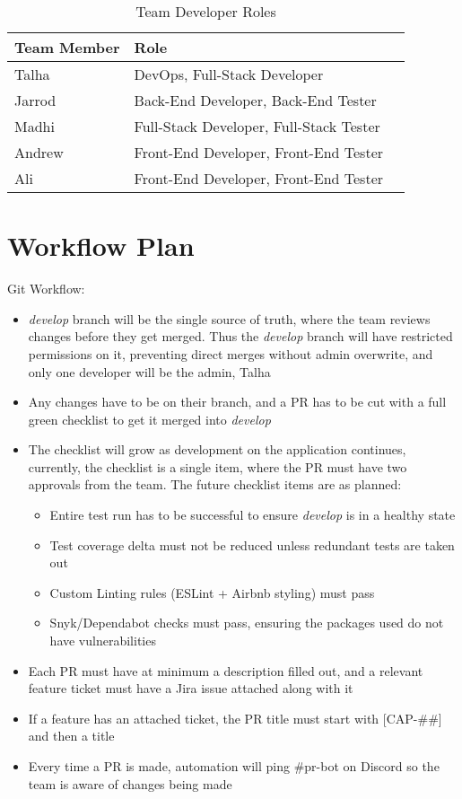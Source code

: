 \documentclass{article}
\begin{document}
\begin{table}[hp]
\caption{Team Developer Roles} \label{TblDevRoles}
\begin{tabularx}{\textwidth}{llX}
\toprule
\textbf{Team Member} & \textbf{Role}\\
\midrule
Talha & DevOps, Full-Stack Developer\\
Jarrod & Back-End Developer, Back-End Tester\\
Madhi & Full-Stack Developer, Full-Stack Tester\\
Andrew & Front-End Developer, Front-End Tester\\
Ali & Front-End Developer, Front-End Tester\\
\bottomrule
\end{tabularx}
\end{table}

\section{Workflow Plan}
Git Workflow: 
\begin{itemize}
	\item \emph{develop} branch will be the single source of truth, where the team reviews changes before they get merged. Thus the \emph{develop} branch will have restricted permissions on it, preventing direct merges without admin overwrite, and only one developer will be the admin, Talha
	\item Any changes have to be on their branch, and a PR has to be cut with a full green checklist to get it merged into \emph{develop}
	\item The checklist will grow as development on the application continues, currently, the checklist is a single item, where the PR must have two approvals from the team. The future checklist items are as planned:
	\begin{itemize}
		\item Entire test run has to be successful to ensure \emph{develop} is in a healthy state
		\item Test coverage delta must not be reduced unless redundant tests are taken out
		\item Custom Linting rules (ESLint + Airbnb styling) must pass
		\item Snyk/Dependabot checks must pass, ensuring the packages used do not have vulnerabilities
	\end{itemize}
	\item Each PR must have at minimum a description filled out, and a relevant feature ticket must have a Jira issue attached along with it
	\item If a feature has an attached ticket, the PR title must start with [CAP-\#\#] and then a title
	\item Every time a PR is made, automation will ping \#{}pr-bot on Discord so the team is aware of changes being made
\end{itemize}
\end{document}
